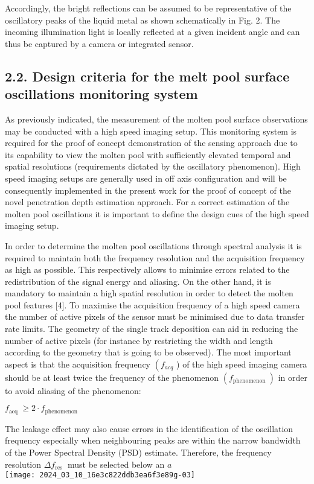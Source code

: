 \documentclass[10pt]{article}
\begin{document}
Accordingly, the bright reflections can be assumed to be representative of the oscillatory peaks of the liquid metal as shown schematically in Fig. 2. The incoming illumination light is locally reflected at a given incident angle and can thus be captured by a camera or integrated sensor.

\subsection*{2.2. Design criteria for the melt pool surface oscillations monitoring system}
As previously indicated, the measurement of the molten pool surface observations may be conducted with a high speed imaging setup. This monitoring system is required for the proof of concept demonstration of the sensing approach due to its capability to view the molten pool with sufficiently elevated temporal and spatial resolutions (requirements dictated by the oscillatory phenomenon). High speed imaging setups are generally used in off axis configuration and will be consequently implemented in the present work for the proof of concept of the novel penetration depth estimation approach. For a correct estimation of the molten pool oscillations it is important to define the design cues of the high speed imaging setup.

In order to determine the molten pool oscillations through spectral analysis it is required to maintain both the frequency resolution and the acquisition frequency as high as possible. This respectively allows to minimise errors related to the redistribution of the signal energy and aliasing. On the other hand, it is mandatory to maintain a high spatial resolution in order to detect the molten pool features [4]. To maximise the acquisition frequency of a high speed camera the number of active pixels of the sensor must be minimised due to data transfer rate limits. The geometry of the single track deposition can aid in reducing the number of active pixels (for instance by restricting the width and length according to the geometry that is going to be observed). The most important aspect is that the acquisition frequency $\left(f_{a c q}\right.$ ) of the high speed imaging camera should be at least twice the frequency of the phenomenon $\left(f_{\text {phenomenon }}\right)$ in order to avoid aliasing of the phenomenon:

$f_{\text {acq }} \geq 2 \cdot f_{\text {phenomenon }}$

The leakage effect may also cause errors in the identification of the oscillation frequency especially when neighbouring peaks are within the narrow bandwidth of the Power Spectral Density (PSD) estimate. Therefore, the frequency resolution $\Delta f_{\text {res }}$ must be selected below an $a$\\
\texttt{[image: 2024\_03\_10\_16e3c822ddb3ea6f3e89g-03]}
\end{document}
